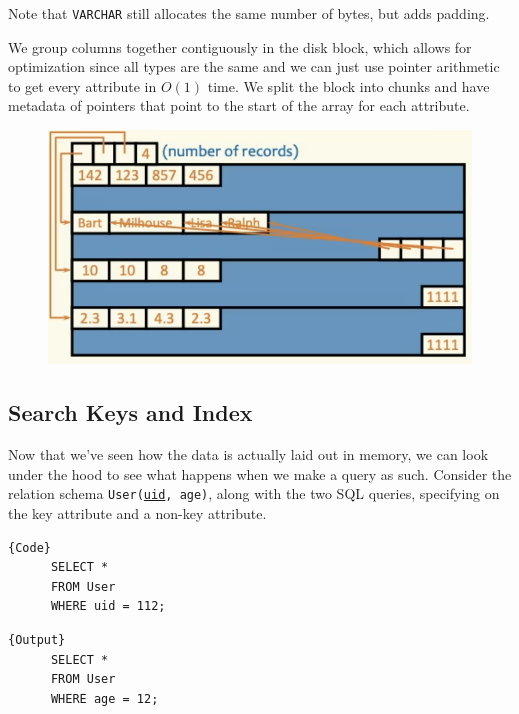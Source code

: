   Note that \texttt{VARCHAR} still allocates the same number of bytes, but adds padding. 

  \begin{definition}
    We group columns together contiguously in the disk block, which allows for optimization since all types are the same and we can just use pointer arithmetic to get every attribute in $O(1)$ time. We split the block into chunks and have metadata of pointers that point to the start of the array for each attribute. 

    \begin{figure}[H]
      \centering 
      \includegraphics[scale=0.6]{img/column_major.png}
      \caption{} 
      \label{fig:column_major}
    \end{figure}
  \end{definition}

\subsection{Search Keys and Index} 

  Now that we've seen how the data is actually laid out in memory, we can look under the hood to see what happens when we make a query as such. Consider the relation schema \texttt{User(\underline{uid}, age)}, along with the two SQL queries, specifying on the key attribute and a non-key attribute. 
  
  \noindent\begin{minipage}{.5\textwidth}
    \begin{lstlisting}[]{Code}
      SELECT * 
      FROM User 
      WHERE uid = 112;
    \end{lstlisting}
    \end{minipage}
    \hfill
    \begin{minipage}{.49\textwidth}
    \begin{lstlisting}[]{Output}
      SELECT * 
      FROM User 
      WHERE age = 12;
    \end{lstlisting}
  \end{minipage} 

